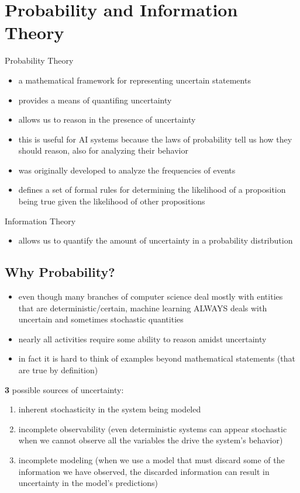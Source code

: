 \documentclass[11pt, twocolumn]{report}
\begin{document}
\setcounter{chapter}{2}
\chapter{Probability and Information Theory}
Probability Theory
\begin{itemize}
  \item a mathematical framework for representing uncertain statements
  \item provides a means of quantifing uncertainty
  \item allows us to reason in the presence of uncertainty
  \item this is useful for AI systems because the laws of probability tell us
    how they should reason, also for analyzing their behavior
  \item was originally developed to analyze the frequencies of events
  \item defines a set of formal rules for determining the likelihood of a
    proposition being true given the likelihood of other propositions
\end{itemize}

Information Theory
\begin{itemize}
  \item allows us to quantify the amount of uncertainty in a probability
    distribution
\end{itemize}

\section{Why Probability?}
\begin{itemize}
  \item even though many branches of computer science deal mostly with entities
    that are deterministic/certain, machine learning ALWAYS deals with
    uncertain and sometimes stochastic quantities
  \item nearly all activities require some ability to reason amidst uncertainty
  \item in fact it is hard to think of examples beyond mathematical statements
    (that are true by definition) 
\end{itemize}

\textbf{3} possible sources of uncertainty:
\begin{enumerate}
  \item inherent stochasticity in the system being modeled
  \item incomplete observability (even deterministic systems can appear
    stochastic when we cannot observe all the variables the drive the system's
    behavior)
  \item incomplete modeling (when we use a model that must discard some of the
    information we have observed, the discarded information can result in
    uncertainty in the model's predictions)
\end{enumerate}
\end{document}
